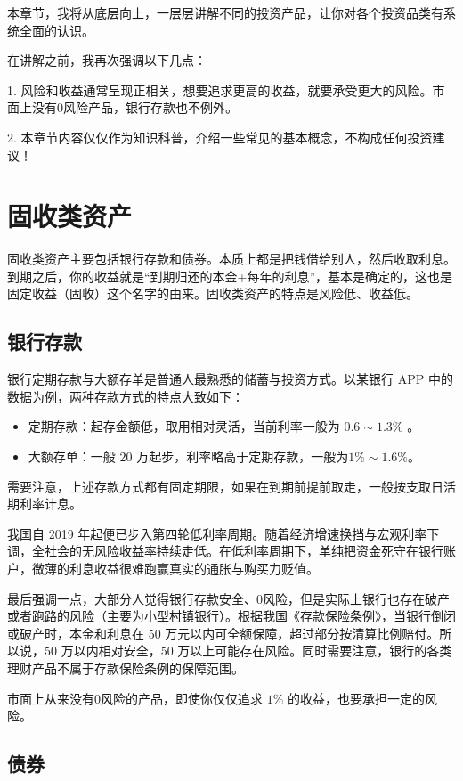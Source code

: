 \documentclass[12pt,openany]{book}
\begin{document}
本章节，我将从底层向上，一层层讲解不同的投资产品，让你对各个投资品类有系统全面的认识。

在讲解之前，我再次强调以下几点：

1. 风险和收益通常呈现正相关，想要追求更高的收益，就要承受更大的风险。市面上没有0风险产品，银行存款也不例外。

2. 本章节内容仅仅作为知识科普，介绍一些常见的基本概念，不构成任何投资建议！

\section{固收类资产}

固收类资产主要包括银行存款和债券。本质上都是把钱借给别人，然后收取利息。到期之后，你的收益就是“到期归还的本金+每年的利息”，基本是确定的，这也是固定收益（固收）这个名字的由来。固收类资产的特点是风险低、收益低。

\subsection{银行存款}

银行定期存款与大额存单是普通人最熟悉的储蓄与投资方式。以某银行 APP 中的数据为例，两种存款方式的特点大致如下：

\begin{itemize}
    \item 定期存款：起存金额低，取用相对灵活，当前利率一般为 $0.6 \sim 1.3\%$ 。
    \item 大额存单：一般 $20$ 万起步，利率略高于定期存款，一般为$1\% \sim 1.6\%$。
\end{itemize}

需要注意，上述存款方式都有固定期限，如果在到期前提前取走，一般按支取日活期利率计息。

我国自 2019 年起便已步入第四轮低利率周期。随着经济增速换挡与宏观利率下调，全社会的无风险收益率持续走低。在低利率周期下，单纯把资金死守在银行账户，微薄的利息收益很难跑赢真实的通胀与购买力贬值。

最后强调一点，大部分人觉得银行存款安全、0风险，但是实际上银行也存在破产或者跑路的风险（主要为小型村镇银行）。根据我国《存款保险条例》，当银行倒闭或破产时，本金和利息在 $50$ 万元以内可全额保障，超过部分按清算比例赔付。所以说，$50$ 万以内相对安全，$50$ 万以上可能存在风险。同时需要注意，银行的各类理财产品不属于存款保险条例的保障范围。

市面上从来没有0风险的产品，即使你仅仅追求 $1\%$ 的收益，也要承担一定的风险。

\subsection{债券}
\end{document}
